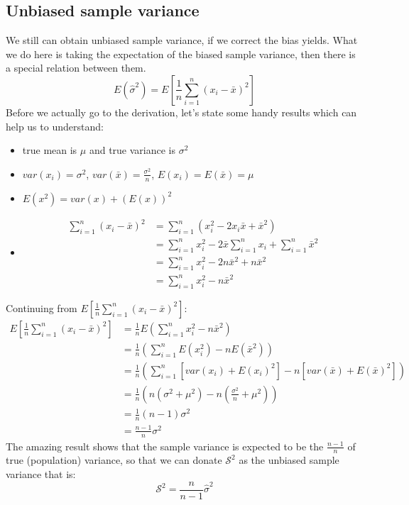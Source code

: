 \documentclass[12pt ]{article}
\begin{document}
\subsection{Unbiased sample variance}
We still can obtain unbiased sample variance, if we correct the bias yields. What we do here is taking the expectation of the biased sample variance, then there is a special relation between them.
\begin{equation*}
E(\hat{\sigma}^2) = E[\frac{1}{n} \sum_{i=1}^{n} (x_{i} - \bar{x})^2]
\end{equation*}
\color{blue}
Before we actually go to the derivation, let's state some handy results which can help us to understand:
\begin{itemize}
\item true mean is $\mu$ and true variance is $\sigma^2$
\item $var(x_{i}) = \sigma^2$, $var(\bar{x}) = \frac{\sigma^2}{n}$, $E(x_{i}) = E(\bar{x}) = \mu$
\item $E(x^2) = var(x) + (E(x))^2$
\item \begin{align*}
\sum_{i=1}^{n} (x_{i} - \bar{x})^2 &= \sum_{i=1}^{n} (x_{i}^2 - 2x_{i}\bar{x} + \bar{x}^2) \\
&= \sum_{i=1}^{n} x_{i}^2 - 2\bar{x}\sum_{i=1}^{n} x_{i} + \sum_{i=1}^{n} \bar{x}^2 \\
&= \sum_{i=1}^{n} x_{i}^2 - 2n\bar{x}^2 + n\bar{x}^2 \\
&= \sum_{i=1}^{n} x_{i}^2 - n\bar{x}^2
\end{align*}
\end{itemize}
\color{black}
Continuing from $E[\frac{1}{n} \sum_{i=1}^{n} (x_{i} - \bar{x})^2]$:
\begin{align*}
E[\frac{1}{n} \sum_{i=1}^{n} (x_{i} - \bar{x})^2] &= \frac{1}{n} E(\sum_{i=1}^{n} x_{i}^2 - n\bar{x}^2) \\
&= \frac{1}{n} (\sum_{i=1}^{n}E(x_{i}^2) - nE(\bar{x}^2)) \\
&= \frac{1}{n} (\sum_{i=1}^{n}[var(x_{i}) + E(x_{i})^2]- n [var(\bar{x}) + E(\bar{x})^2]) \\
&= \frac{1}{n} (n (\sigma^2 + \mu^2) - n(\frac{\sigma^2}{n} + \mu^2)) \\
&= \frac{1}{n} (n-1) \sigma^2 \\
&= \frac{n-1}{n} \sigma^2
\end{align*}
The amazing result shows that the sample variance is expected to be the $\frac{n-1}{n}$ of true (population) variance, so that we can donate $\mathcal{S}^2$ as the unbiased sample variance that is:
\begin{equation}
\mathcal{S}^2 = \frac{n}{n-1} \hat{\sigma}^2
\end{equation}
\end{document}
